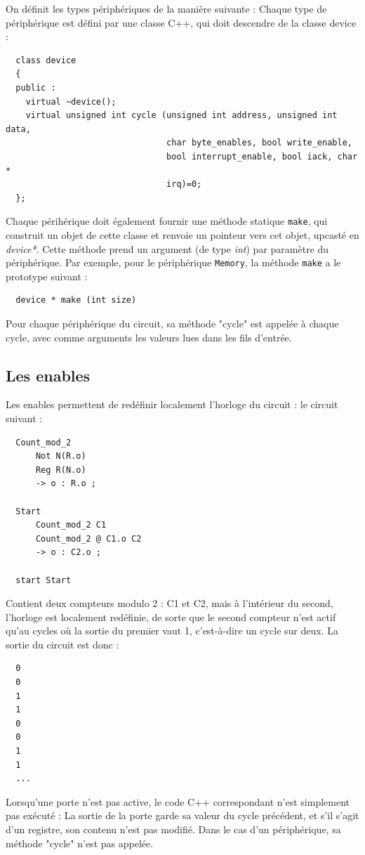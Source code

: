 \documentclass[13pt]{article}
\begin{document}
On définit les types périphériques de la manière suivante :
Chaque type de périphérique est défini par une classe C++, qui doit
descendre de la classe device :
\begin{verbatim}
  class device
  {
  public :
    virtual ~device();
    virtual unsigned int cycle (unsigned int address, unsigned int data,
                                char byte_enables, bool write_enable,
                                bool interrupt_enable, bool iack, char *
                                irq)=0;
  };
\end{verbatim}
Chaque périhérique doit également fournir une méthode statique \texttt{make}, qui
construit un objet de cette classe et renvoie un pointeur vers cet objet,
upcasté en \emph{device*}. Cette méthode prend un argument (de type \emph{int}) par
paramètre du périphérique. Par exemple, pour le périphérique \texttt{Memory}, la
méthode \texttt{make} a le prototype suivant :

\begin{verbatim}
  device * make (int size)
\end{verbatim}

Pour chaque périphérique du circuit, sa méthode "cycle" est appelée à
chaque cycle, avec comme arguments les valeurs lues dans les fils d'entrée.


\subsection{Les enables}

Les enables permettent de redéfinir localement l'horloge du circuit :
le circuit suivant :
\begin{verbatim}
  Count_mod_2
      Not N(R.o)
      Reg R(N.o)
      -> o : R.o ;

  Start
      Count_mod_2 C1
      Count_mod_2 @ C1.o C2
      -> o : C2.o ;

  start Start
\end{verbatim}

Contient deux compteurs modulo 2 : C1 et C2, mais à l'intérieur du second,
l'horloge est localement redéfinie, de sorte que le second compteur n'est
actif qu'au cycles où la sortie du premier vaut 1, c'est-à-dire un cycle
sur deux. La sortie du circuit est donc :

\begin{verbatim}
  0
  0
  1
  1
  0
  0
  1
  1
  ...
\end{verbatim}
Lorsqu'une porte n'est pas active, le code C++ correspondant n'est
simplement pas exécuté : La sortie de la porte garde sa valeur du cycle
précédent, et s'il s'agit d'un registre, son contenu n'est pas
modifié. Dans le cas d'un périphérique, sa méthode "cycle" n'est pas
appelée.
\end{document}
